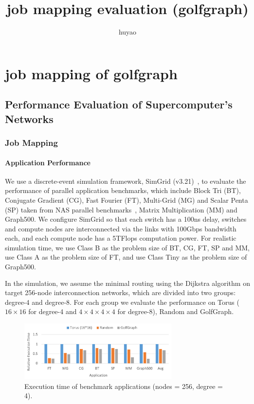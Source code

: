 \documentclass[conference]{IEEEtran}
\begin{document}
\title{job mapping evaluation (golfgraph)}
\author{huyao}
\date{}
\maketitle
\else
\chapter{job mapping of golfgraph}
\fi
\section{Performance Evaluation of Supercomputer's Networks}
\subsection{Job Mapping}

\subsubsection{Application Performance}

We use a discrete-event simulation framework, SimGrid (v3.21)~\cite{SimGrid}, to evaluate the performance of parallel application benchmarks,  which include Block Tri (BT), Conjugate Gradient (CG), Fast Fourier (FT), Multi-Grid (MG) and Scalar Penta (SP) taken from NAS parallel benchmarks~\cite{benchmark}, Matrix Multiplication (MM) and Graph500.   
We configure SimGrid so that each switch has a 100ns delay, switches and compute nodes are interconnected via the links with 100Gbps bandwidth each, and each compute node has a 5TFlops computation power. 
For realistic simulation time, we use Class B as the problem size of BT, CG, FT, SP and MM, use Class A as the problem size of FT, and use Class Tiny as the problem size of Graph500.

In the simulation, we assume the minimal routing using the Dijkstra algorithm on target 256-node interconnection networks, which are divided into two groups: degree-4 and degree-8.
For each group we evaluate the performance on Torus ($16 \times 16$ for degree-4 and $4 \times 4 \times 4 \times 4$ for degree-8), Random and GolfGraph.

\begin{figure}[tb]
	\centering
	\includegraphics[width=8cm]{ps/exec-d4.pdf}
	\caption{Execution time of benchmark applications (nodes = 256, degree = 4).}
	\label{fig:exec-d4}
\end{figure}
\end{document}
